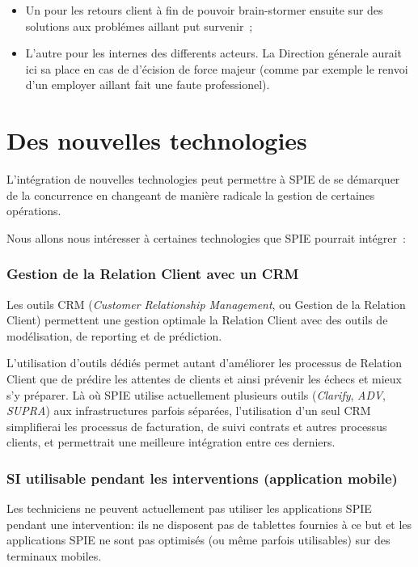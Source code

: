 \begin{itemize}
    \item Un pour les retours client \`a fin de pouvoir brain-stormer ensuite sur des solutions aux probl\'emes aillant
    put survenir~;
    \item L'autre pour les internes des differents acteurs. La Direction g\'enerale aurait ici sa place en cas
    de d'\'ecision de force majeur (comme par exemple le renvoi d'un employer aillant fait une faute professionel).
\end{itemize}


\section{Des nouvelles technologies}

L'intégration de nouvelles technologies peut permettre à SPIE de se démarquer de la concurrence en changeant de manière radicale la gestion de certaines opérations.

Nous allons nous intéresser à certaines technologies que SPIE pourrait intégrer~:


    \subsubsection{Gestion de la Relation Client avec un CRM}

        Les outils CRM (\textit{Customer Relationship Management}, ou Gestion de la Relation Client) permettent une gestion optimale la Relation Client avec des outils de modélisation, de reporting et de prédiction.

        L'utilisation d'outils dédiés permet autant d'améliorer les processus de Relation Client que de prédire les attentes de clients et ainsi prévenir les échecs et mieux s'y préparer. Là où SPIE utilise actuellement plusieurs outils (\textit{Clarify}, \textit{ADV}, \textit{SUPRA}) aux infrastructures parfois séparées, l'utilisation d'un seul CRM simplifierai les processus de facturation, de suivi contrats et autres processus clients, et permettrait une meilleure intégration entre ces derniers.

    \subsubsection{SI utilisable pendant les interventions (application mobile)}

        Les techniciens ne peuvent actuellement pas utiliser les applications SPIE pendant une intervention: ils ne disposent pas de tablettes fournies à ce but et les applications SPIE ne sont pas optimisés (ou même parfois utilisables) sur des terminaux mobiles.

